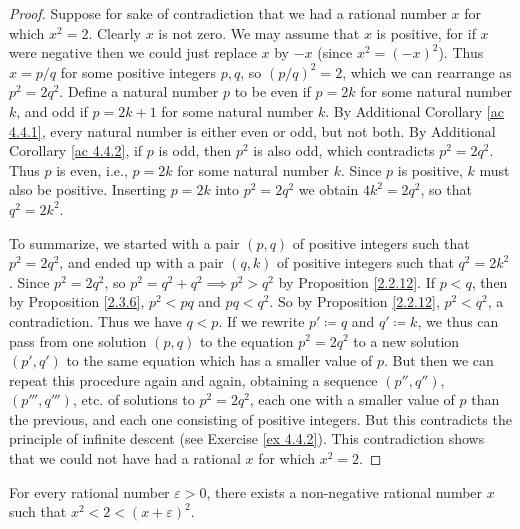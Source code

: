 \begin{proof}
    Suppose for sake of contradiction that we had a rational number \(x\) for which \(x^2 = 2\).
    Clearly \(x\) is not zero.
    We may assume that \(x\) is positive, for if \(x\) were negative then we could just replace \(x\) by \(-x\)
    (since \(x^2 = (-x)^2\)).
    Thus \(x = p / q\) for some positive integers \(p, q\), so \((p / q)^2 = 2\), which we can rearrange as \(p^2 = 2q^2\).
    Define a natural number \(p\) to be even if \(p = 2k\) for some natural number \(k\), and odd if \(p = 2k + 1\) for some natural number \(k\).
    By Additional Corollary \ref{ac 4.4.1}, every natural number is either even or odd, but not both.
    By Additional Corollary \ref{ac 4.4.2}, if \(p\) is odd, then \(p^2\) is also odd, which contradicts \(p^2 = 2q^2\).
    Thus \(p\) is even, i.e., \(p = 2k\) for some natural number \(k\).
    Since \(p\) is positive, \(k\) must also be positive.
    Inserting \(p = 2k\) into \(p^2 = 2q^2\) we obtain \(4k^2 = 2q^2\), so that \(q^2 = 2k^2\).

    To summarize, we started with a pair \((p, q)\) of positive integers such that \(p^2 = 2q^2\), and ended up with a pair \((q, k)\) of positive integers such that \(q^2 = 2k^2\).
    Since \(p^2 = 2q^2\), so \(p^2 = q^2 + q^2 \implies p^2 > q^2\) by Proposition \ref{2.2.12}.
    If \(p < q\), then by Proposition \ref{2.3.6}, \(p^2 < pq\) and \(pq < q^2\).
    So by Proposition \ref{2.2.12}, \(p^2 < q^2\), a contradiction.
    Thus we have \(q < p\).
    If we rewrite \(p' \coloneqq q\) and \(q' \coloneqq k\), we thus can pass from one solution \((p, q)\) to the equation \(p^2 = 2q^2\) to a new solution \((p', q')\) to the same equation which has a smaller value of \(p\).
    But then we can repeat this procedure again and again, obtaining a sequence \((p'', q'')\), \((p''', q''')\), etc. of solutions to \(p^2 = 2q^2\), each one with a smaller value of \(p\) than the previous, and each one consisting of positive integers.
    But this contradicts the principle of infinite descent (see Exercise \ref{ex 4.4.2}).
    This contradiction shows that we could not have had a rational \(x\) for which \(x^2 = 2\).
\end{proof}

\begin{proposition}\label{4.4.5}
    For every rational number \(\varepsilon > 0\), there exists a non-negative rational number \(x\) such that \(x^2 < 2 < (x + \varepsilon)^2\).
\end{proposition}

